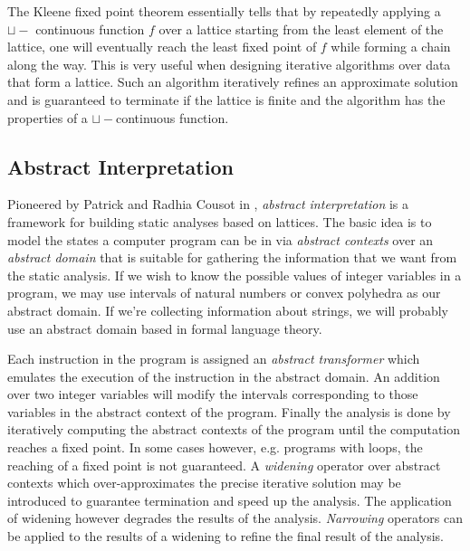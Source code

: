 The Kleene fixed point theorem essentially tells that by repeatedly applying a $\sqcup-$ continuous function $f$ over a lattice starting from the least element of the lattice, one will eventually reach the least fixed point of $f$ while forming a chain along the way. This is very useful when designing iterative algorithms over data that form a lattice. Such an algorithm iteratively refines an approximate solution and is guaranteed to terminate if the lattice is finite and the algorithm has the properties of a $\sqcup-$continuous function.

\subsection{Abstract Interpretation}
Pioneered by Patrick and Radhia Cousot in \cite{Cousot77}, \emph{abstract interpretation} is a framework for building static analyses based on lattices. The basic idea is to model the states a computer program can be in via \emph{abstract contexts} over an \emph{abstract domain} that is suitable for gathering the information that we want from the static analysis. If we wish to know the possible values of integer variables in a program, we may use intervals of natural numbers or convex polyhedra as our abstract domain. If we're collecting information about strings, we will probably use an abstract domain based in formal language theory.

Each instruction in the program is assigned an \emph{abstract transformer} which emulates the execution of the instruction in the abstract domain. An addition over two integer variables will modify the intervals corresponding to those variables in the abstract context of the program. Finally the analysis is done by iteratively computing the abstract contexts of the program until the computation reaches a fixed point. In some cases however, e.g. programs with loops, the reaching of a fixed point is not guaranteed. A \emph{widening} operator over abstract contexts which over-approximates the precise iterative solution may be introduced to guarantee termination and speed up the analysis. The application of widening however degrades the results of the analysis. \emph{Narrowing} operators can be applied to the results of a widening to refine the final result of the analysis.

